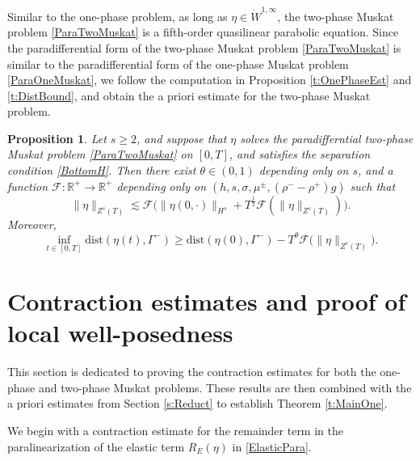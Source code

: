 \documentclass[12pt]{amsart}
\newtheorem{proposition}[theorem]{Proposition}
\theoremstyle{definition}
\numberwithin{equation}{section}
\newcommand{\R}{\mathbb{R}}
\newcommand{\f}{\frac}
\begin{document}
Similar to the one-phase problem, as long as $\eta \in \dot{W}^{1,\infty}$, the two-phase Muskat problem \eqref{ParaTwoMuskat} is a fifth-order quasilinear parabolic equation.
Since the paradifferential form of the two-phase Muskat problem \eqref{ParaTwoMuskat} is similar to the paradifferential form of the one-phase Muskat problem \eqref{ParaOneMuskat}, we follow the computation in Proposition \ref{t:OnePhaseEst} and \ref{t:DistBound}, and obtain the a priori estimate for the two-phase Muskat problem.
\begin{proposition} \label{t:TwoPhaseEst}
Let $s\geq 2$, and suppose that $\eta$ solves the paradifferntial two-phase Muskat problem \eqref{ParaTwoMuskat} on $[0,T]$, and satisfies the separation condition \eqref{BottomH}.
Then there exist $\theta\in (0,1)$ depending only on $s$, and a function $\mathcal{F}: \R^+ \rightarrow \R^+$ depending only on $(h,s, \sigma, \mu^\pm, (\rho^- -\rho^+)g)$ such that
\begin{equation*} 
  \| \eta\|_{Z^s(T)} \lesssim \mathcal{F}\big(\|\eta(0,\cdot)\|_{H^s} + T^\f12\mathcal{F}( \| \eta\|_{Z^s(T)})\big).
\end{equation*}
Moreover, 
\begin{equation*} 
    \inf_{t\in[0,T]} \text{dist}(\eta(t), \Gamma^{-}) \geq \text{dist}(\eta(0), \Gamma^{-}) - T^\theta \mathcal{F}\big(\| \eta\|_{Z^s(T)}\big).
\end{equation*}
\end{proposition}

\section{Contraction estimates and proof of local well-posedness} \label{s:Contraction}
This section is dedicated to proving the contraction estimates for both the one-phase and two-phase Muskat problems.
These results are then combined with the a priori estimates from Section \ref{s:Reduct} to establish Theorem \ref{t:MainOne}.

We begin with a contraction estimate for the remainder term in the paralinearization of the elastic term $R_E(\eta)$ in \eqref{ElasticPara}.
\end{document}
